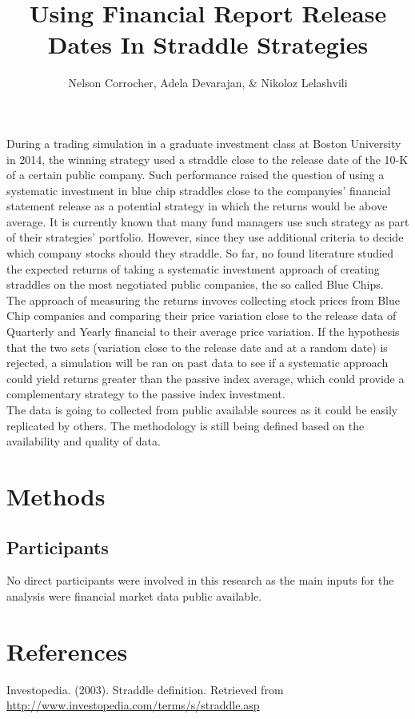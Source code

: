 \documentclass[english,man]{apa6}
\title{Using Financial Report Release Dates In Straddle Strategies}
\author{Nelson Corrocher, Adela Devarajan, \& Nikoloz Lelashvili}
\affiliation{
    \vspace{0.5cm}
          \textsuperscript{} Harrisburg University  }
\begin{document}
\maketitle



During a trading simulation in a graduate investment class at Boston
University in 2014, the winning strategy used a straddle close to the
release date of the 10-K of a certain public company. Such performance
raised the question of using a systematic investment in blue chip
straddles close to the companyies' financial statement release as a
potential strategy in which the returns would be above average. It is
currently known that many fund managers use such strategy as part of
their strategies' portfolio. However, since they use additional criteria
to decide which company stocks should they straddle. So far, no found
literature studied the expected returns of taking a systematic
investment approach of creating straddles on the most negotiated public
companies, the so called Blue Chips.\\
 The approach of measuring the returns invoves collecting stock prices
from Blue Chip companies and comparing their price variation close to
the release data of Quarterly and Yearly financial to their average
price variation. If the hypothesis that the two sets (variation close to
the release date and at a random date) is rejected, a simulation will be
ran on past data to see if a systematic approach could yield returns
greater than the passive index average, which could provide a
complementary strategy to the passive index investment.\\
 The data is going to collected from public available sources as it
could be easily replicated by others. The methodology is still being
defined based on the availability and quality of data.

\section{Methods}\label{methods}

\subsection{Participants}\label{participants}

No direct participants were involved in this research as the main inputs
for the analysis were financial market data public available.

\newpage

\section{References}\label{references}

\setlength{\parindent}{-0.5in} \setlength{\leftskip}{0.5in}

\hypertarget{refs}{}
\hypertarget{ref-straddle}{}
Investopedia. (2003). Straddle definition. Retrieved from
\url{http://www.investopedia.com/terms/s/straddle.asp}
\end{document}

